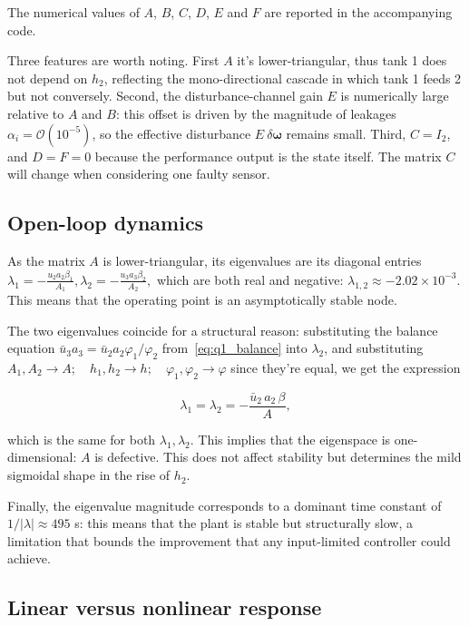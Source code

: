 \documentclass[10pt,a4paper]{scrartcl}
\begin{document}
The numerical values of $A$, $B$, $C$, $D$, $E$ and $F$ are reported in the accompanying code.

Three features are worth noting. First $A$ it's lower-triangular, thus tank 1 does not depend on $h_2$, reflecting the mono-directional cascade in which tank 1 feeds 2 but not conversely. Second, the disturbance-channel gain $E$ is numerically large relative to $A$ and $B$: this offset is driven by the magnitude of leakages $\alpha_i = \mathcal O(10^{-5})$, so the effective disturbance $E \ \delta \bm \omega $ remains small. 
Third, $C=I_2$, and $D=F=0$ because the performance output is the state itself. The matrix $C$ will change when considering one faulty sensor. 

\subsection{Open-loop dynamics}

As the matrix $A$ is lower-triangular, its eigenvalues are its diagonal entries  $\lambda_1=-\frac{u_2a_2\beta_1}{A_1},\lambda_2=-\frac{u_3a_3\beta_2}{A_2},$
which are both real and negative: $\lambda_{1,2}\approx-2.02\times10^{-3}$. This means that the operating point is an asymptotically stable node. 

The two eigenvalues coincide for a structural reason: substituting the balance equation $\bar u_3a_3=\bar u_2a_2\varphi_1/\varphi_2$ from~\eqref{eq:q1_balance}
into $\lambda_2$, and substituting $A_1, A_2 \to A; \quad h_1, h_2 \to h; \quad \varphi_1, \varphi_2 \to \varphi$ 
since they're equal, we get the expression 

\begin{equation}
    \lambda_1=\lambda_2=-\frac{\bar u_2\,a_2\,\beta}{A},
    \label{eq:q1_sameEW}
\end{equation}

which is the same for both $\lambda_1, \lambda_2$. This implies that the eigenspace is one-dimensional: $A$ is defective. This does not affect stability but determines the mild sigmoidal shape in the rise of $h_2$. 

Finally, the eigenvalue magnitude  corresponds to a dominant time constant of $1/|\lambda| \approx 495$ s: this means that the plant is stable but structurally slow, a limitation that bounds the improvement that any input-limited controller could achieve.

\subsection{Linear versus nonlinear response}
\end{document}
